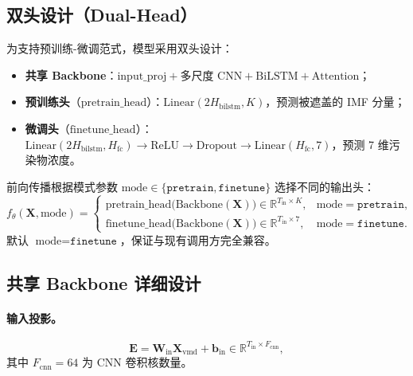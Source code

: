 \documentclass[11pt,a4paper]{article}
\newcommand{\R}{\mathbb{R}}
\newcommand{\mat}[1]{\bm{#1}}
\newcommand{\vect}[1]{\bm{#1}}
\begin{document}
\subsection{双头设计（Dual-Head）}
为支持预训练-微调范式，模型采用双头设计：
\begin{itemize}[leftmargin=*]
  \item \textbf{共享 Backbone}：$\text{input\_proj} + \text{多尺度 CNN} + \text{BiLSTM} + \text{Attention}$；
  \item \textbf{预训练头}（$\text{pretrain\_head}$）：$\text{Linear}(2H_{\text{bilstm}}, K)$，预测被遮盖的 IMF 分量；
  \item \textbf{微调头}（$\text{finetune\_head}$）：$\text{Linear}(2H_{\text{bilstm}}, H_{\text{fc}}) \to \text{ReLU} \to \text{Dropout} \to \text{Linear}(H_{\text{fc}}, 7)$，预测 7 维污染物浓度。
\end{itemize}

前向传播根据模式参数 $\text{mode} \in \{\texttt{pretrain}, \texttt{finetune}\}$ 选择不同的输出头：
\begin{equation}
f_{\theta}(\mat{X}, \text{mode}) =
\begin{cases}
\text{pretrain\_head}\bigl(\text{Backbone}(\mat{X})\bigr) \in \R^{T_{\text{in}} \times K}, & \text{mode} = \texttt{pretrain}, \\
\text{finetune\_head}\bigl(\text{Backbone}(\mat{X})\bigr) \in \R^{T_{\text{in}} \times 7}, & \text{mode} = \texttt{finetune}.
\end{cases}
\end{equation}
默认 $\text{mode} = \texttt{finetune}$，保证与现有调用方完全兼容。

\subsection{共享 Backbone 详细设计}

\paragraph{输入投影。}
\[
\mat{E} = \mat{W}_{\text{in}} \mat{X}_{\text{vmd}} + \vect{b}_{\text{in}} \in \R^{T_{\text{in}} \times F_{\text{cnn}}},
\]
其中 $F_{\text{cnn}} = 64$ 为 CNN 卷积核数量。
\end{document}
